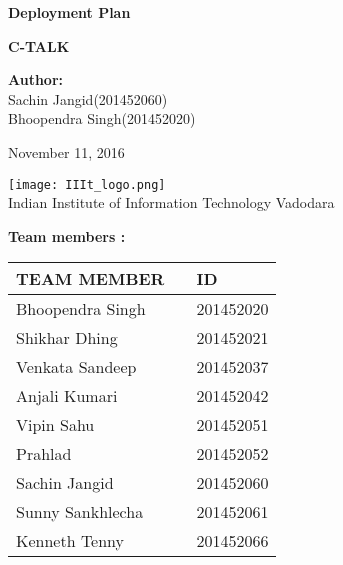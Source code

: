 \documentclass[12pt]{article}
\def\mydate{November 11, 2016}
\begin{document}
	
	\begin{titlepage}
		\begin{center}
			
			
			\LARGE{\textbf{Deployment Plan}}
			
			\vspace{1.5cm}
			
			\textbf{C-TALK}\\
			
			\vspace{2cm}
		 
        \large{\textbf{Author:}}
			  \large{ \\ Sachin Jangid(201452060) \\ Bhoopendra Singh(201452020)\\}	
			  
			  
			\vspace{1.5cm}
			\mydate{}
			
			
			\vspace{5cm}
			\texttt{[image: IIIt\_logo.png]} \\
			\Large{Indian Institute of Information Technology Vadodara} \\
			
		\end{center}
	\end{titlepage}
	\textbf{Team members :} \\
		\begin{center}
		
		\begin{tabular}{ |m{10em} m{8em} m{9em}|}
			\hline
			TEAM MEMBER          &   & ID        \\
			\hline
			Bhoopendra Singh     &   & 201452020 \\
			Shikhar Dhing        &   & 201452021 \\
			Venkata Sandeep      &   & 201452037 \\
			Anjali Kumari        &   & 201452042 \\
			Vipin Sahu           &   & 201452051 \\
			Prahlad              &   & 201452052 \\ 
			Sachin Jangid        &   & 201452060 \\
			Sunny Sankhlecha     &   & 201452061 \\
			Kenneth Tenny        &   & 201452066 \\
			\hline
		\end{tabular}
		
	\end{center}
	\vspace{2em}
	
\end{document}
